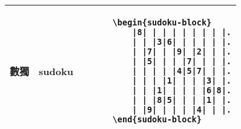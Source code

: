 \documentclass{../indiv}
\begin{document}
{\begin{table}[H]
\begin{tabular}{Z}
				數獨 & sudoku &
				\begin{tabmp}
					\centering
				\end{tabmp} &
				\begin{tabmp}[-0.2]
					\begin{verbatim}
	\begin{sudoku-block}
		|8| | | | | | | | |.
		| | |3|6| | | | | |.
		| |7| | |9| |2| | |.
		| |5| | | |7| | | |.
		| | | | |4|5|7| | |.
		| | | |1| | | |3| |.
		| | |1| | | | |6|8|.
		| | |8|5| | | |1| |.
		| |9| | | | |4| | |.
	\end{sudoku-block}
					\end{verbatim}
				\end{tabmp} \\ \hline
			\end{tabular}
		\end{table}
		\pagebreak
		\begin{table}[H]
			\ContinuedFloat
			\centering
			

\end{table}}
\end{document}
